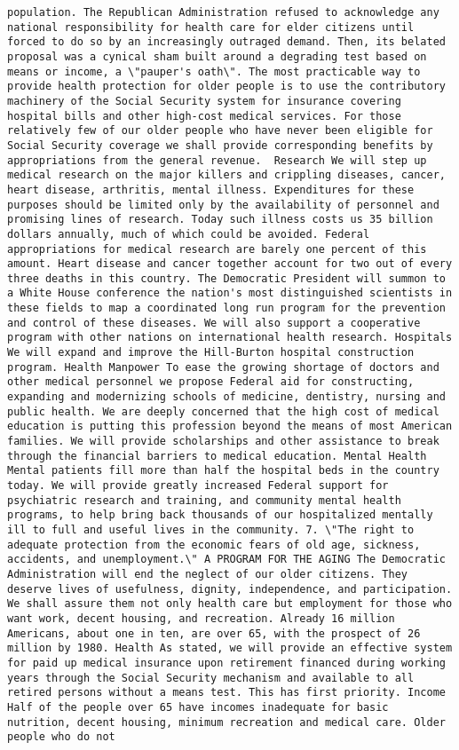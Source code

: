 \documentclass[
]{article}
\begin{document}
\begin{verbatim}
population. The Republican Administration refused to acknowledge any national responsibility for health care for elder citizens until forced to do so by an increasingly outraged demand. Then, its belated proposal was a cynical sham built around a degrading test based on means or income, a \"pauper's oath\". The most practicable way to provide health protection for older people is to use the contributory machinery of the Social Security system for insurance covering hospital bills and other high-cost medical services. For those relatively few of our older people who have never been eligible for Social Security coverage we shall provide corresponding benefits by appropriations from the general revenue.  Research We will step up medical research on the major killers and crippling diseases, cancer, heart disease, arthritis, mental illness. Expenditures for these purposes should be limited only by the availability of personnel and promising lines of research. Today such illness costs us 35 billion dollars annually, much of which could be avoided. Federal appropriations for medical research are barely one percent of this amount. Heart disease and cancer together account for two out of every three deaths in this country. The Democratic President will summon to a White House conference the nation's most distinguished scientists in these fields to map a coordinated long run program for the prevention and control of these diseases. We will also support a cooperative program with other nations on international health research. Hospitals We will expand and improve the Hill-Burton hospital construction program. Health Manpower To ease the growing shortage of doctors and other medical personnel we propose Federal aid for constructing, expanding and modernizing schools of medicine, dentistry, nursing and public health. We are deeply concerned that the high cost of medical education is putting this profession beyond the means of most American families. We will provide scholarships and other assistance to break through the financial barriers to medical education. Mental Health Mental patients fill more than half the hospital beds in the country today. We will provide greatly increased Federal support for psychiatric research and training, and community mental health programs, to help bring back thousands of our hospitalized mentally ill to full and useful lives in the community. 7. \"The right to adequate protection from the economic fears of old age, sickness, accidents, and unemployment.\" A PROGRAM FOR THE AGING The Democratic Administration will end the neglect of our older citizens. They deserve lives of usefulness, dignity, independence, and participation. We shall assure them not only health care but employment for those who want work, decent housing, and recreation. Already 16 million Americans, about one in ten, are over 65, with the prospect of 26 million by 1980. Health As stated, we will provide an effective system for paid up medical insurance upon retirement financed during working years through the Social Security mechanism and available to all retired persons without a means test. This has first priority. Income Half of the people over 65 have incomes inadequate for basic nutrition, decent housing, minimum recreation and medical care. Older people who do not 
\end{verbatim}
\end{document}

